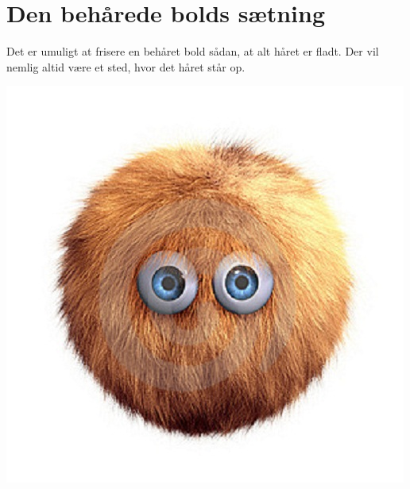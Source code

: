\begin{minipage}[t]{100mm}
\vspace{3mm}

\section*{Den behårede bolds sætning}

Det er umuligt at frisere en behåret bold sådan, at alt håret er fladt. Der vil nemlig altid være et sted, hvor det håret står op.

\includegraphics[width=\linewidth]{hairyball.jpg}

\end{minipage}

